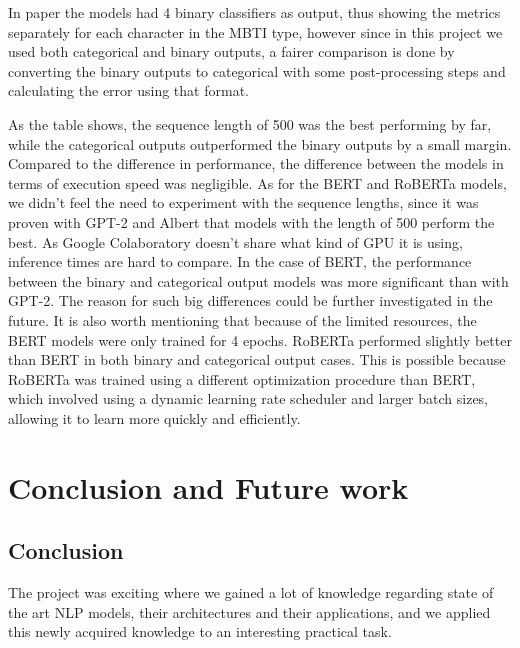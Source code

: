 \documentclass[runningheads]{llncs}
\begin{document}
In paper \cite{MBTI_class} the models had 4 binary classifiers as output, thus showing the metrics separately for each character in the MBTI type, however since in this project we used both categorical and binary outputs, a fairer comparison is done by converting the binary outputs to categorical with some post-processing steps and calculating the error using that format.

As the table shows, the sequence length of 500 was the best performing by far, while the categorical outputs outperformed the binary outputs by a small margin. Compared to the difference in performance, the difference between the models in terms of execution speed was negligible.
As for the BERT and RoBERTa models, we didn't feel the need to experiment with the sequence lengths, since it was proven with GPT-2 and Albert that models with the length of 500 perform the best. As Google Colaboratory doesn't share what kind of GPU it is using, inference times are hard to compare. In the case of BERT, the performance between the binary and categorical output models was more significant than with GPT-2. The reason for such big differences could be further investigated in the future. It is also worth mentioning that because of the limited resources, the BERT models were only trained for 4 epochs. RoBERTa performed slightly better than BERT in both binary and categorical output cases. This is possible because RoBERTa was trained using a different optimization procedure than BERT, which involved using a dynamic learning rate scheduler and larger batch sizes, allowing it to learn more quickly and efficiently.

\section{Conclusion and Future work}

\subsection{Conclusion}

The project was exciting where we gained a lot of knowledge regarding state of the art NLP models, their architectures and their applications, and we applied this newly acquired knowledge to an interesting practical task.
\end{document}

